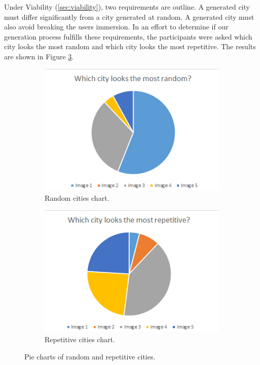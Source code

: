 Under Viability (\ref{sec:viability}), two requirements are outline. A generated city must differ significantly from a city generated at random. A generated city must also avoid breaking the users immersion. In an effort to determine if our generation process fulfills these requirements, the participants were asked which city looks the most random and which city looks the most repetitive. The results are shown in Figure \ref{fig:pie-chart-random-repetitive}.

\begin{figure}[h]
	\begin{subfigure}{0.5\textwidth}
		\centering
		\includegraphics[width=0.95\linewidth]{"Images/Random"}
		\caption{Random cities chart.}
		\label{fig:pie-chart-random}
	\end{subfigure}
	\begin{subfigure}{0.5\textwidth}
		\centering
		\includegraphics[width=0.95\linewidth]{"Images/Repetitive"}
		\caption{Repetitive cities chart.}
		\label{fig:pie-chart-repetitive}
	\end{subfigure}
	\caption{Pie charts of random and repetitive cities.}
	\label{fig:pie-chart-random-repetitive}
\end{figure}

